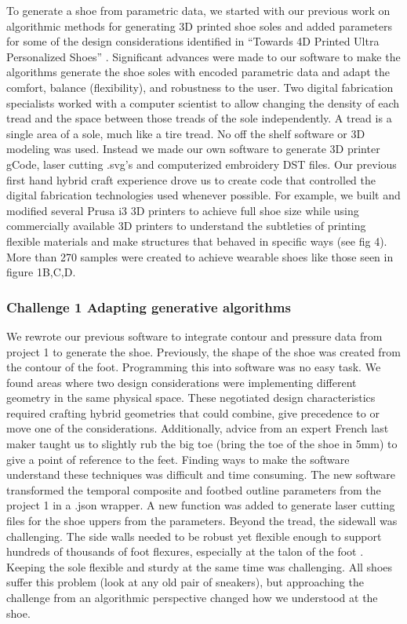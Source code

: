 To generate a shoe from parametric data, we started with our previous work on algorithmic methods for generating 3D printed shoe soles \cite{Feijs2016} and added parameters for some of the design considerations identified in ``Towards 4D Printed Ultra Personalized Shoes'' \cite{nachtigall2018towards}. Significant advances were made to our software \cite{Feijs2015} to make the algorithms generate the shoe soles with encoded parametric data and adapt the comfort, balance (flexibility), and robustness to the user. Two digital fabrication specialists worked with a computer scientist to allow changing the density of each  tread and the space between those treads of the sole independently. A tread is a single area of a sole, much like a tire tread.
No off the shelf software or 3D modeling was used. Instead we made our own software to generate 3D printer gCode, laser cutting .svg's and computerized embroidery DST files. Our previous first hand hybrid craft experience drove us to create code \cite{Feijs2016} that controlled the digital fabrication technologies used whenever possible. For example, we built and modified several Prusa i3 3D printers to achieve full shoe size while using commercially available 3D printers to understand the subtleties of printing flexible materials and make structures that behaved in specific ways (see fig 4). More than 270 samples were created to achieve wearable shoes like those seen in figure 1B,C,D. 


\subsubsection{Challenge 1 Adapting generative algorithms}

We rewrote our previous software \cite{Feijs2015} to integrate contour and pressure data from project 1 to generate the shoe. Previously, the shape of the shoe was created from the contour of the foot. Programming this into software was no easy task. We found areas where two design considerations were implementing different geometry in the same physical space. These negotiated design characteristics required crafting hybrid geometries that could combine, give precedence to or move one of the considerations. Additionally, advice from an expert French last maker taught us to slightly rub the big toe (bring the toe of the shoe in 5mm) to give a point of reference to the feet. Finding ways to make the software understand these techniques was difficult and time consuming.  
The new software transformed the temporal composite and footbed outline parameters from the project 1 in a .json wrapper. A new function was added to generate laser cutting files for the shoe uppers from the parameters. Beyond the tread,  the sidewall was challenging. The side walls needed to be robust yet flexible enough to support hundreds of thousands of foot flexures, especially at the talon of the foot . Keeping the sole flexible and sturdy at the same time was challenging. All shoes suffer this problem (look at any old pair of sneakers), but approaching the challenge from an algorithmic perspective changed how we  understood at the shoe. 


